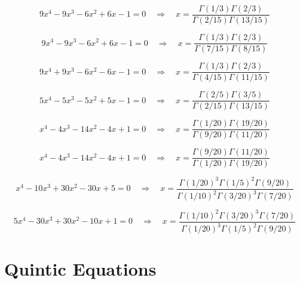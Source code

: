 \documentclass[11pt,a4paper]{article}
\begin{document}
\begin{equation}\label{eq:116}
9x^{4} - 9x^{3} - 6x^{2} + 6x - 1 = 0 \quad \Rightarrow \quad x = \frac{\Gamma(1/3)\Gamma(2/3)}{\Gamma(2/15)\Gamma(13/15)}
\end{equation}

\begin{equation}\label{eq:117}
9x^{4} - 9x^{3} - 6x^{2} + 6x - 1 = 0 \quad \Rightarrow \quad x = \frac{\Gamma(1/3)\Gamma(2/3)}{\Gamma(7/15)\Gamma(8/15)}
\end{equation}

\begin{equation}\label{eq:118}
9x^{4} + 9x^{3} - 6x^{2} - 6x - 1 = 0 \quad \Rightarrow \quad x = \frac{\Gamma(1/3)\Gamma(2/3)}{\Gamma(4/15)\Gamma(11/15)}
\end{equation}

\begin{equation}\label{eq:119}
5x^{4} - 5x^{3} - 5x^{2} + 5x - 1 = 0 \quad \Rightarrow \quad x = \frac{\Gamma(2/5)\Gamma(3/5)}{\Gamma(2/15)\Gamma(13/15)}
\end{equation}

\begin{equation}\label{eq:120}
x^{4} - 4x^{3} - 14x^{2} - 4x + 1 = 0 \quad \Rightarrow \quad x = \frac{\Gamma(1/20)\Gamma(19/20)}{\Gamma(9/20)\Gamma(11/20)}
\end{equation}

\begin{equation}\label{eq:121}
x^{4} - 4x^{3} - 14x^{2} - 4x + 1 = 0 \quad \Rightarrow \quad x = \frac{\Gamma(9/20)\Gamma(11/20)}{\Gamma(1/20)\Gamma(19/20)}
\end{equation}

\begin{equation}\label{eq:122}
x^{4} - 10x^{3} + 30x^{2} - 30x + 5 = 0 \quad \Rightarrow \quad x = \frac{\Gamma(1/20)^3\Gamma(1/5)^2\Gamma(9/20)}{\Gamma(1/10)^2\Gamma(3/20)^3\Gamma(7/20)}
\end{equation}

\begin{equation}\label{eq:123}
5x^{4} - 30x^{3} + 30x^{2} - 10x + 1 = 0 \quad \Rightarrow \quad x = \frac{\Gamma(1/10)^2\Gamma(3/20)^3\Gamma(7/20)}{\Gamma(1/20)^3\Gamma(1/5)^2\Gamma(9/20)}
\end{equation}

\section{Quintic Equations}
\end{document}
